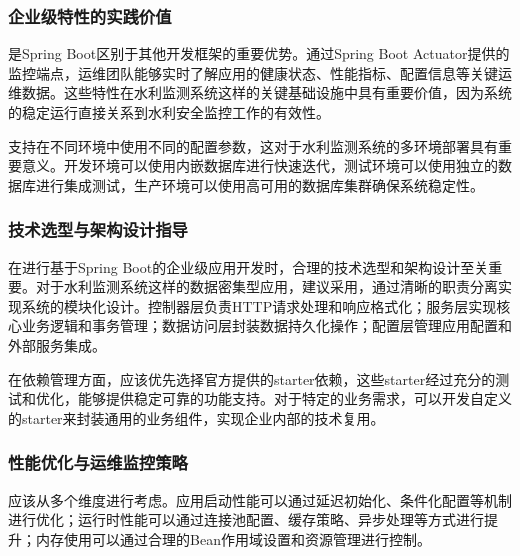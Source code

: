 \hypertarget{ux4f01ux4e1aux7ea7ux7279ux6027ux7684ux5b9eux8df5ux4ef7ux503c}{%
\subsubsection{企业级特性的实践价值}\label{ux4f01ux4e1aux7ea7ux7279ux6027ux7684ux5b9eux8df5ux4ef7ux503c}}

是Spring Boot区别于其他开发框架的重要优势。通过Spring Boot Actuator提供的监控端点，运维团队能够实时了解应用的健康状态、性能指标、配置信息等关键运维数据。这些特性在水利监测系统这样的关键基础设施中具有重要价值，因为系统的稳定运行直接关系到水利安全监控工作的有效性。

支持在不同环境中使用不同的配置参数，这对于水利监测系统的多环境部署具有重要意义。开发环境可以使用内嵌数据库进行快速迭代，测试环境可以使用独立的数据库进行集成测试，生产环境可以使用高可用的数据库集群确保系统稳定性。

\hypertarget{ux6280ux672fux9009ux578bux4e0eux67b6ux6784ux8bbeux8ba1ux6307ux5bfc}{%
\subsubsection{技术选型与架构设计指导}\label{ux6280ux672fux9009ux578bux4e0eux67b6ux6784ux8bbeux8ba1ux6307ux5bfc}}

在进行基于Spring Boot的企业级应用开发时，合理的技术选型和架构设计至关重要。对于水利监测系统这样的数据密集型应用，建议采用，通过清晰的职责分离实现系统的模块化设计。控制器层负责HTTP请求处理和响应格式化；服务层实现核心业务逻辑和事务管理；数据访问层封装数据持久化操作；配置层管理应用配置和外部服务集成。

在依赖管理方面，应该优先选择官方提供的starter依赖，这些starter经过充分的测试和优化，能够提供稳定可靠的功能支持。对于特定的业务需求，可以开发自定义的starter来封装通用的业务组件，实现企业内部的技术复用。

\hypertarget{ux6027ux80fdux4f18ux5316ux4e0eux8fd0ux7ef4ux76d1ux63a7ux7b56ux7565}{%
\subsubsection{性能优化与运维监控策略}\label{ux6027ux80fdux4f18ux5316ux4e0eux8fd0ux7ef4ux76d1ux63a7ux7b56ux7565}}

应该从多个维度进行考虑。应用启动性能可以通过延迟初始化、条件化配置等机制进行优化；运行时性能可以通过连接池配置、缓存策略、异步处理等方式进行提升；内存使用可以通过合理的Bean作用域设置和资源管理进行控制。

